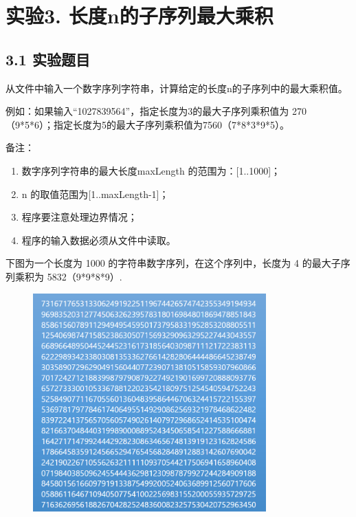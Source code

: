 \vspace{-3cm}\chapter{实验3. 长度n的子序列最大乘积}

\section{3.1 实验题目}
从文件中输入一个数字序列字符串，计算给定的长度n的子序列中的最大乘积值。

例如：如果输入“1027839564”，指定长度为3的最大子序列乘积值为 270（9*5*6）；指定长度为5的最大子序列乘积值为7560（7*8*3*9*5）。

备注：
\begin{enumerate}
    \item 数字序列字符串的最大长度maxLength 的范围为：[1..1000]；
    \item n 的取值范围为[1..maxLength-1]；
    \item 程序要注意处理边界情况；
    \item 程序的输入数据必须从文件中读取。
\end{enumerate}

下图为一个长度为 1000 的字符串数字序列，在这个序列中，长度为 4 的最大子序列乘积为 5832（9*9*8*9）. 
\begin{figure}[H]
    \centering
    \includegraphics[width = 0.8\textwidth]{../pic/3/3.0.png}
\end{figure}